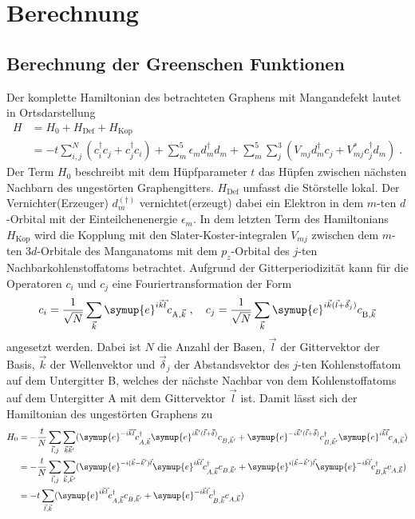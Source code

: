 \chapter{Berechnung}
\label{chap:berechnung}
\section{Berechnung der Greenschen Funktionen}
\label{sec:calc_greensfunction}
Der komplette Hamiltonian des betrachteten Graphens mit Mangandefekt lautet in Ortsdarstellung 
\begin{align}
   H &=  H_0 + H_\text{Def} + H_\text{Kop}\\
    &=- t \sum_{i,j}^N \left ( c_i^\dagger c_j + c_j^\dagger c_i \right )  + \sum_m^5 \epsilon_m d_m^\dagger d_m
    + \sum_m^5 \sum_j^3 \left ( V_{mj} d_m^\dagger c_j + V^*_{mj} c_j^\dagger d_m \right )  \; \text{.} \label{eqn:full_Hamiltonian}
\end{align}
Der Term $H_0$ beschreibt mit dem Hüpfparameter $t$ das Hüpfen zwischen nächsten Nachbarn des ungestörten Graphengitters.
$H_\text{Def}$ umfasst die Störstelle lokal. Der Vernichter(Erzeuger) $d_m^{(\dagger)}$ vernichtet(erzeugt) dabei ein
Elektron in dem $m$-ten $d$-Orbital mit der Einteilchenenergie $\epsilon_m$.
In dem letzten Term des Hamiltonians $H_\text{Kop}$ wird die Kopplung mit den Slater-Koster-integralen
$V_{mj}$ zwischen dem $m$-ten $3d$-Orbitale des Manganatoms mit dem $p_z$-Orbital des $j$-ten Nachbarkohlenstoffatoms betrachtet.
Aufgrund der Gitterperiodizität kann für die Operatoren $c_i$ und $c_j$ eine Fouriertransformation der Form 
\begin{equation}
    c_i = \frac{1}{\sqrt{N}} \sum_{\vec{k}} \symup{e}^{i\vec{k}\vec{l}} c_{\text{A}, \vec{k}} \; , 
    \quad c_j = \frac{1}{\sqrt{N}} \sum_{\vec{k}} \symup{e}^{i\vec{k}(\vec{l}+\vec{\delta}_j)} c_{\text{B}, \vec{k}} \label{eqn:fourier_ladder}
\end{equation}
angesetzt werden.
Dabei ist $N$ die Anzahl der Basen, $\vec{l}$ der Gittervektor der Basis, $\vec{k}$ der Wellenvektor und $\vec{\delta}_j$ der Abstandsvektor
des $j$-ten Kohlenstoffatom auf dem Untergitter B, welches der nächste Nachbar von dem Kohlenstoffatoms auf dem Untergitter A mit dem Gittervektor $\vec{l}$ ist.
Damit lässt sich der Hamiltonian des ungestörten Graphens zu 
\begin{align*}
    H_0 &= -\frac{t}{N} \sum_{\vec{l}, j} \sum_{\vec{k}\vec{k}'} ( \symup{e}^{-i\vec{k}\vec{l}}c^\dagger_{A,\vec{k}} 
    \symup{e}^{i\vec{k}'(\vec{l}+\vec{\delta})}c_{B,\vec{k}'} + \symup{e}^{-i\vec{k}'(\vec{l}+\vec{\delta})} c^\dagger_{B,\vec{k}'} 
    \symup{e}^{i\vec{k}\vec{l}}c_{A,\vec{k}}) \\
    &= -\frac{t}{N} \sum_{\vec{l}, j} \sum_{\vec{k},\vec{k}'} ( \symup{e}^{-i(\vec{k}- \vec{k}')\vec{l}}\symup{e}^{i\vec{k}\vec{l}}c^\dagger_{A,\vec{k}} c_{B,\vec{k}'} + 
    \symup{e}^{i(\vec{k}- \vec{k}')\vec{l}} \symup{e}^{-i\vec{k}\vec{l}} c^\dagger_{B,\vec{k}}c_{A,\vec{k}}) \\
    &= -t \sum_{\vec{l}, \vec{k}} ( \symup{e}^{i\vec{k}\vec{l}}c^\dagger_{A,\vec{k}} c_{B,\vec{k}'} + 
    \symup{e}^{-i\vec{k}\vec{l}} c^\dagger_{B,\vec{k}}c_{A,\vec{k}})
\end{align*}
